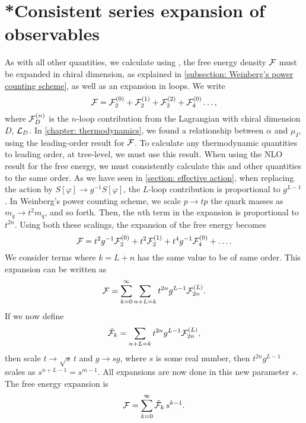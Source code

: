 \section{*Consistent series expansion of observables}
\label{appendix: consisten expansion}

As with all other quantities, we calculate using \chpt, the free energy density $\mathcal{F}$ must be expanded in chiral dimension, as explained in \autoref{subsection: Weinberg's power counting scheme}, as well as an expansion in loops.
We write
%
\begin{equation}
    \mathcal{F} = \mathcal{F}^{(0)}_2 + \mathcal{F}^{(1)}_2 + \mathcal{F}^{(2)}_2 + \mathcal{F}^{(0)}_4 \dots,
\end{equation}
%
where $\mathcal{F}^{(n)}_D$ is the $n$-loop contribution from the Lagrangian with chiral dimension $D$, $\mathcal{L}_D$.
In \autoref{chapter: thermodynamics}, we found a relationship between $\alpha$ and $\mu_I$, using the leading-order result for $\mathcal{F}$.
To calculate any thermodynamic quantities to leading order, at tree-level, we must use this result.
When using the NLO result for the free energy, we must consistently calculate this and other quantities to the same order.
As we have seen in \autoref{section: effective action}, when replacing the action by $S[\varphi] \rightarrow g^{-1}S[\varphi]$, the $L$-loop contribution is proportional to $g^{L-1}$.
In Weinberg's power counting scheme, we scale $p \rightarrow t p$ the quark masses as $m_q \rightarrow t^2 m_q$, and so forth.
Then, the $n$th term in the expansion is proportional to $t^{2n}$.
Using both these scalings, the expansion of the free energy becomes
%
\begin{equation}
    \mathcal{F} = t^2 g^{-1} \mathcal{F}_2^{(0)} + t^2 \mathcal{F}_2^{(1)} + t^4 g^{-1} \mathcal{F}_4^{(0)}
    + \dots .
\end{equation}
%
We consider terms where $k = L + n$ has the same value to be of same order.
This expansion can be written as
\begin{equation}
    \mathcal{F} = \sum_{k=0}^\infty \sum_{n+L=k} t^{2n} g^{L-1} \mathcal{F}_{2n}^{(L)}.
\end{equation}
%
If we now define
\begin{equation}
    \tilde {\mathcal{F}}_k = \sum_{n+L=k} t^{2n} g^{L-1} \mathcal{F}_{2n}^{(L)},
\end{equation}
%
then scale $t \rightarrow \sqrt{s} \, t$ and $g \rightarrow s g$, where $s$ is some real number, then $t^{2n}g^{L-1}$ scales as $s^{n+L-1} = s^{m-1}$.
All expansions are now done in this new parameter $s$.
The free energy expansion is
\begin{equation}
    \mathcal{F} = \sum_{k = 0}^\infty \tilde {\mathcal{F}}_k \, s^{k-1}.
\end{equation}
